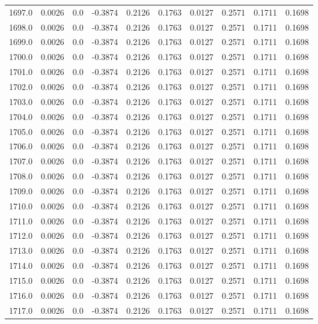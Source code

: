 \begin{longtable}{lrrrrrrrrr}
1697.0 & 0.0026 & 0.0 & -0.3874 & 0.2126 & 0.1763 & 0.0127 & 0.2571 & 0.1711 & 0.1698 \\
1698.0 & 0.0026 & 0.0 & -0.3874 & 0.2126 & 0.1763 & 0.0127 & 0.2571 & 0.1711 & 0.1698 \\
1699.0 & 0.0026 & 0.0 & -0.3874 & 0.2126 & 0.1763 & 0.0127 & 0.2571 & 0.1711 & 0.1698 \\
1700.0 & 0.0026 & 0.0 & -0.3874 & 0.2126 & 0.1763 & 0.0127 & 0.2571 & 0.1711 & 0.1698 \\
1701.0 & 0.0026 & 0.0 & -0.3874 & 0.2126 & 0.1763 & 0.0127 & 0.2571 & 0.1711 & 0.1698 \\
1702.0 & 0.0026 & 0.0 & -0.3874 & 0.2126 & 0.1763 & 0.0127 & 0.2571 & 0.1711 & 0.1698 \\
1703.0 & 0.0026 & 0.0 & -0.3874 & 0.2126 & 0.1763 & 0.0127 & 0.2571 & 0.1711 & 0.1698 \\
1704.0 & 0.0026 & 0.0 & -0.3874 & 0.2126 & 0.1763 & 0.0127 & 0.2571 & 0.1711 & 0.1698 \\
1705.0 & 0.0026 & 0.0 & -0.3874 & 0.2126 & 0.1763 & 0.0127 & 0.2571 & 0.1711 & 0.1698 \\
1706.0 & 0.0026 & 0.0 & -0.3874 & 0.2126 & 0.1763 & 0.0127 & 0.2571 & 0.1711 & 0.1698 \\
1707.0 & 0.0026 & 0.0 & -0.3874 & 0.2126 & 0.1763 & 0.0127 & 0.2571 & 0.1711 & 0.1698 \\
1708.0 & 0.0026 & 0.0 & -0.3874 & 0.2126 & 0.1763 & 0.0127 & 0.2571 & 0.1711 & 0.1698 \\
1709.0 & 0.0026 & 0.0 & -0.3874 & 0.2126 & 0.1763 & 0.0127 & 0.2571 & 0.1711 & 0.1698 \\
1710.0 & 0.0026 & 0.0 & -0.3874 & 0.2126 & 0.1763 & 0.0127 & 0.2571 & 0.1711 & 0.1698 \\
1711.0 & 0.0026 & 0.0 & -0.3874 & 0.2126 & 0.1763 & 0.0127 & 0.2571 & 0.1711 & 0.1698 \\
1712.0 & 0.0026 & 0.0 & -0.3874 & 0.2126 & 0.1763 & 0.0127 & 0.2571 & 0.1711 & 0.1698 \\
1713.0 & 0.0026 & 0.0 & -0.3874 & 0.2126 & 0.1763 & 0.0127 & 0.2571 & 0.1711 & 0.1698 \\
1714.0 & 0.0026 & 0.0 & -0.3874 & 0.2126 & 0.1763 & 0.0127 & 0.2571 & 0.1711 & 0.1698 \\
1715.0 & 0.0026 & 0.0 & -0.3874 & 0.2126 & 0.1763 & 0.0127 & 0.2571 & 0.1711 & 0.1698 \\
1716.0 & 0.0026 & 0.0 & -0.3874 & 0.2126 & 0.1763 & 0.0127 & 0.2571 & 0.1711 & 0.1698 \\
1717.0 & 0.0026 & 0.0 & -0.3874 & 0.2126 & 0.1763 & 0.0127 & 0.2571 & 0.1711 & 0.1698 \\

\end{longtable}
